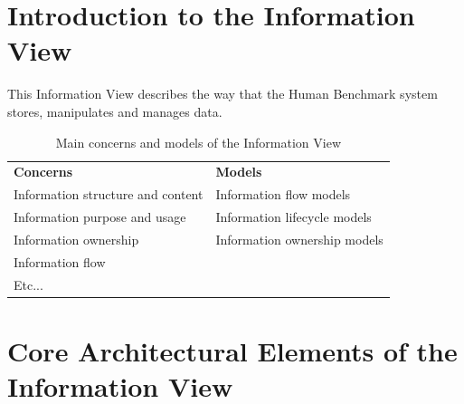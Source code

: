 


% 



\section{Introduction to the Information View}

This Information View describes the way that the Human Benchmark system stores,
manipulates and manages data.

\begin{table}[H]
    \centering
    \begin{tabular}{|l|l|}
        \textbf{Concerns}                 & \textbf{Models}              \\ 
        Information structure and content & Information flow models      \\ 
        Information purpose and usage     & Information lifecycle models \\ 
        Information ownership             & Information ownership models \\ 
        Information flow                  &                              \\ 
        Etc...                            &                              \\ 
    \end{tabular}
    \caption{Main concerns and models of the Information View}
\end{table}


\section{Core Architectural Elements of the Information View}

